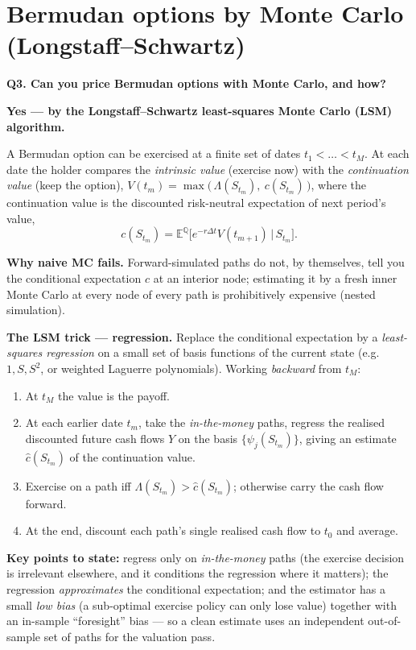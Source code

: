 \documentclass[11pt]{article}
\newcommand{\E}{\mathbb{E}}
\newcommand{\Q}{\mathbb{Q}}
\newcommand{\Qhead}[1]{\bigskip\noindent\textbf{\large #1}\par\nobreak\smallskip}
\begin{document}
\section{Bermudan options by Monte Carlo (Longstaff--Schwartz)}
\Qhead{Q3. Can you price Bermudan options with Monte Carlo, and how?}
\textbf{Yes --- by the Longstaff--Schwartz least-squares Monte Carlo (LSM) algorithm.}

A Bermudan option can be exercised at a finite set of dates $t_1<\dots<t_M$. At each date the holder compares
the \emph{intrinsic value} (exercise now) with the \emph{continuation value} (keep the option),
$V(t_m)=\max\big(\,\Lambda(S_{t_m}),\ c(S_{t_m})\,\big)$, where the continuation value is the discounted
risk-neutral expectation of next period's value,
\[
c(S_{t_m})=\E^{\Q}\!\big[e^{-r\Delta t}V(t_{m+1})\,\big|\,S_{t_m}\big].
\]

\textbf{Why naive MC fails.} Forward-simulated paths do not, by themselves, tell you the conditional
expectation $c$ at an interior node; estimating it by a fresh inner Monte Carlo at every node of every path is
prohibitively expensive (nested simulation).

\textbf{The LSM trick --- regression.} Replace the conditional expectation by a \emph{least-squares
regression} on a small set of basis functions of the current state (e.g.\ $1,S,S^2$, or weighted Laguerre
polynomials). Working \emph{backward} from $t_M$:
\begin{enumerate}
  \item At $t_M$ the value is the payoff.
  \item At each earlier date $t_m$, take the \emph{in-the-money} paths, regress the realised discounted
  future cash flows $Y$ on the basis $\{\psi_j(S_{t_m})\}$, giving an estimate $\hat c(S_{t_m})$ of the
  continuation value.
  \item Exercise on a path iff $\Lambda(S_{t_m})>\hat c(S_{t_m})$; otherwise carry the cash flow forward.
  \item At the end, discount each path's single realised cash flow to $t_0$ and average.
\end{enumerate}
\textbf{Key points to state:} regress only on \emph{in-the-money} paths (the exercise decision is irrelevant
elsewhere, and it conditions the regression where it matters); the regression \emph{approximates} the
conditional expectation; and the estimator has a small \emph{low bias} (a sub-optimal exercise policy can only
lose value) together with an in-sample ``foresight'' bias --- so a clean estimate uses an independent
out-of-sample set of paths for the valuation pass.
\end{document}
